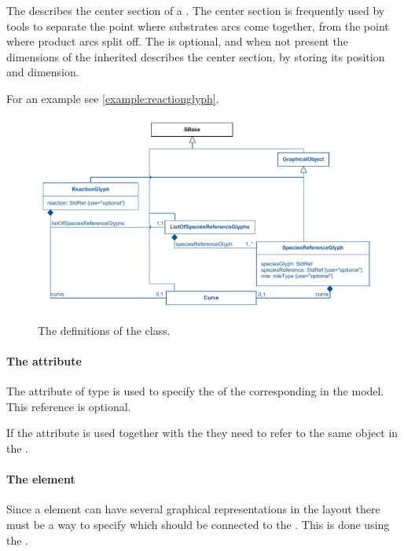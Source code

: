 The \Curve describes the center section of a \ReactionGlyph. The center 
section is frequently used by tools to separate the point where 
substrates arcs come together, from the point where product arcs split 
off. The \Curve is optional, and when not present the dimensions of the 
inherited \BoundingBox describes the center section, by storing its 
position and dimension. 


For an example see \ref{example:reactionglyph}. 


\begin{figure}[!h]
\includegraphics[scale=0.9]{uml/layout-reactionglyph-model-uml}\\
\label{uml:reactionglyph}
\caption{The definitions of the \ReactionGlyph class.}
\end{figure}

\paragraph{The  attribute}
The  attribute of type  is used to 
specify the  of the corresponding \Reaction in the model. This 
reference is optional. 

If the  attribute is used together with the  
they need to refer to the same object in the \Model.

\paragraph {The  element}
\label{listofspeciesreferenceglyphs-class}
Since a \Species element can have several graphical representations in 
the layout there must be a way to specify which \SpeciesGlyph should be 
connected to the \ReactionGlyph. This is done using the 
. 

